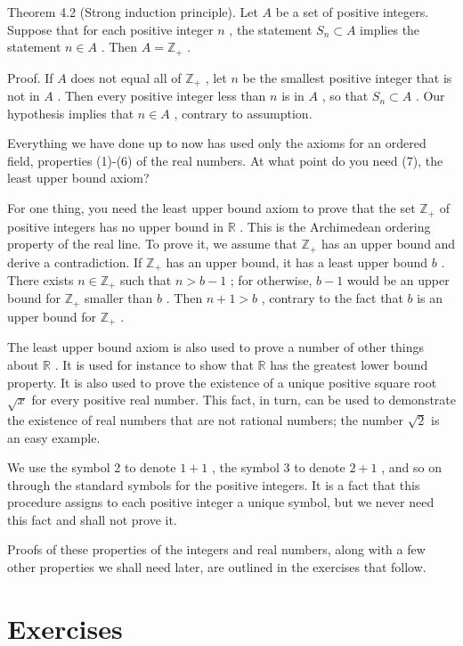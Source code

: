 \documentclass[10pt]{article}
\begin{document}
Theorem 4.2 (Strong induction principle). Let \(A\) be a set of positive integers. Suppose that for each positive integer \(n\) , the statement \({S}_{n} \subset  A\) implies the statement \(n \in  A\) . Then \(A = {\mathbb{Z}}_{ + }\) .

Proof. If \(A\) does not equal all of \({\mathbb{Z}}_{ + }\) , let \(n\) be the smallest positive integer that is not in \(A\) . Then every positive integer less than \(n\) is in \(A\) , so that \({S}_{n} \subset  A\) . Our hypothesis implies that \(n \in  A\) , contrary to assumption.

Everything we have done up to now has used only the axioms for an ordered field, properties (1)-(6) of the real numbers. At what point do you need (7), the least upper bound axiom?

For one thing, you need the least upper bound axiom to prove that the set \({\mathbb{Z}}_{ + }\) of positive integers has no upper bound in \(\mathbb{R}\) . This is the Archimedean ordering property of the real line. To prove it, we assume that \({\mathbb{Z}}_{ + }\) has an upper bound and derive a contradiction. If \({\mathbb{Z}}_{ + }\) has an upper bound, it has a least upper bound \(b\) . There exists \(n \in  {\mathbb{Z}}_{ + }\) such that \(n > b - 1\) ; for otherwise, \(b - 1\) would be an upper bound for \({\mathbb{Z}}_{ + }\) smaller than \(b\) . Then \(n + 1 > b\) , contrary to the fact that \(b\) is an upper bound for \({\mathbb{Z}}_{ + }\) .

The least upper bound axiom is also used to prove a number of other things about \(\mathbb{R}\) . It is used for instance to show that \(\mathbb{R}\) has the greatest lower bound property. It is also used to prove the existence of a unique positive square root \(\sqrt{x}\) for every positive real number. This fact, in turn, can be used to demonstrate the existence of real numbers that are not rational numbers; the number \(\sqrt{2}\) is an easy example.

We use the symbol 2 to denote \(1 + 1\) , the symbol 3 to denote \(2 + 1\) , and so on through the standard symbols for the positive integers. It is a fact that this procedure assigns to each positive integer a unique symbol, but we never need this fact and shall not prove it.

Proofs of these properties of the integers and real numbers, along with a few other properties we shall need later, are outlined in the exercises that follow.

\section*{Exercises}
\end{document}
